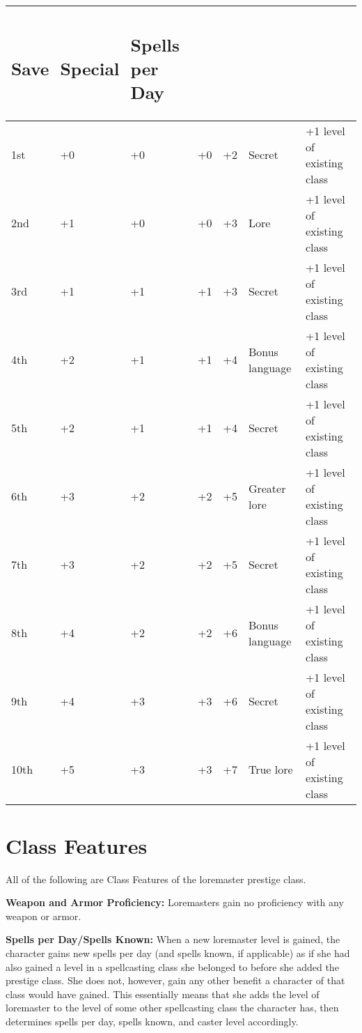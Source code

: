 \documentclass{article}
\begin{document}
\begin{tabular}{|>{\raggedright}p{24pt}|>{\raggedright}p{29pt}|>{\raggedright}p{20pt}|>{\raggedright}p{20pt}|>{\raggedright}p{20pt}|>{\raggedright}p{59pt}|>{\raggedright}p{91pt}|}
\subsection*{\textbf{Save}} & \subsection*{S\textbf{pecial}} & \subsection*{S\textbf{pells 
per Day}}\tabularnewline
\hline
1st & +0 & +0 & +0 & +2 & Secret & +1 level of existing class\tabularnewline
\hline
2nd & +1 & +0 & +0 & +3 & Lore & +1 level of existing class\tabularnewline
\hline
3rd & +1 & +1 & +1 & +3 & Secret & +1 level of existing class\tabularnewline
\hline
4th & +2 & +1 & +1 & +4 & Bonus language & +1 level of existing class\tabularnewline
\hline
5th & +2 & +1 & +1 & +4 & Secret & +1 level of existing class\tabularnewline
\hline
6th & +3 & +2 & +2 & +5 & Greater lore & +1 level of existing class\tabularnewline
\hline
7th & +3 & +2 & +2 & +5 & Secret & +1 level of existing class\tabularnewline
\hline
8th & +4 & +2 & +2 & +6 & Bonus language & +1 level of existing class\tabularnewline
\hline
9th & +4 & +3 & +3 & +6 & Secret & +1 level of existing class\tabularnewline
\hline
10th & +5 & +3 & +3 & +7 & True lore & +1 level of existing class\tabularnewline
\hline
\end{tabular}

\vspace{12pt}
\section*{\textbf{Class Features}}

All of the following are Class Features of the loremaster prestige class.

\textbf{Weapon and Armor Proficiency:} Loremasters gain no proficiency with any 
weapon or armor.

\textbf{Spells per Day/Spells Known: }When a new loremaster level is gained, the 
character gains new spells per day (and spells known, if applicable) as if she 
had also gained a level in a spellcasting class she belonged to before she added 
the prestige class. She does not, however, gain any other benefit a character of 
that class would have gained. This essentially means that she adds the level of 
loremaster to the level of some other spellcasting class the character has, then 
determines spells per day, spells known, and caster level accordingly.
\end{document}
